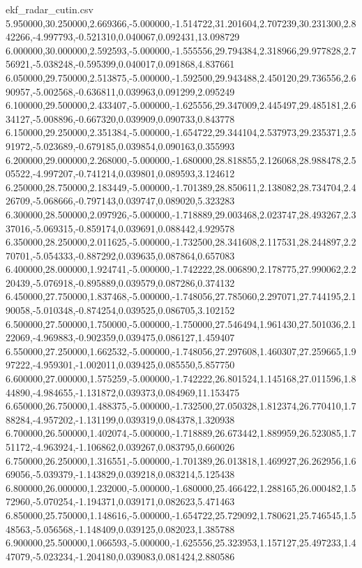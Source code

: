 \begin{filecontents*}[overwrite]{ekf_radar_cutin.csv}
5.950000,30.250000,2.669366,-5.000000,-1.514722,31.201604,2.707239,30.231300,2.842266,-4.997793,-0.521310,0.040067,0.092431,13.098729
6.000000,30.000000,2.592593,-5.000000,-1.555556,29.794384,2.318966,29.977828,2.756921,-5.038248,-0.595399,0.040017,0.091868,4.837661
6.050000,29.750000,2.513875,-5.000000,-1.592500,29.943488,2.450120,29.736556,2.690957,-5.002568,-0.636811,0.039963,0.091299,2.095249
6.100000,29.500000,2.433407,-5.000000,-1.625556,29.347009,2.445497,29.485181,2.634127,-5.008896,-0.667320,0.039909,0.090733,0.843778
6.150000,29.250000,2.351384,-5.000000,-1.654722,29.344104,2.537973,29.235371,2.591972,-5.023689,-0.679185,0.039854,0.090163,0.355993
6.200000,29.000000,2.268000,-5.000000,-1.680000,28.818855,2.126068,28.988478,2.505522,-4.997207,-0.741214,0.039801,0.089593,3.124612
6.250000,28.750000,2.183449,-5.000000,-1.701389,28.850611,2.138082,28.734704,2.426709,-5.068666,-0.797143,0.039747,0.089020,5.323283
6.300000,28.500000,2.097926,-5.000000,-1.718889,29.003468,2.023747,28.493267,2.337016,-5.069315,-0.859174,0.039691,0.088442,4.929578
6.350000,28.250000,2.011625,-5.000000,-1.732500,28.341608,2.117531,28.244897,2.270701,-5.054333,-0.887292,0.039635,0.087864,0.657083
6.400000,28.000000,1.924741,-5.000000,-1.742222,28.006890,2.178775,27.990062,2.220439,-5.076918,-0.895889,0.039579,0.087286,0.374132
6.450000,27.750000,1.837468,-5.000000,-1.748056,27.785060,2.297071,27.744195,2.190058,-5.010348,-0.874254,0.039525,0.086705,3.102152
6.500000,27.500000,1.750000,-5.000000,-1.750000,27.546494,1.961430,27.501036,2.122069,-4.969883,-0.902359,0.039475,0.086127,1.459407
6.550000,27.250000,1.662532,-5.000000,-1.748056,27.297608,1.460307,27.259665,1.997222,-4.959301,-1.002011,0.039425,0.085550,5.857750
6.600000,27.000000,1.575259,-5.000000,-1.742222,26.801524,1.145168,27.011596,1.844890,-4.984655,-1.131872,0.039373,0.084969,11.153475
6.650000,26.750000,1.488375,-5.000000,-1.732500,27.050328,1.812374,26.770410,1.788284,-4.957202,-1.131199,0.039319,0.084378,1.320938
6.700000,26.500000,1.402074,-5.000000,-1.718889,26.673442,1.889959,26.523085,1.751172,-4.963924,-1.106862,0.039267,0.083795,0.660026
6.750000,26.250000,1.316551,-5.000000,-1.701389,26.013818,1.469927,26.262956,1.669056,-5.039379,-1.143829,0.039218,0.083214,5.125438
6.800000,26.000000,1.232000,-5.000000,-1.680000,25.466422,1.288165,26.000482,1.572960,-5.070254,-1.194371,0.039171,0.082623,5.471463
6.850000,25.750000,1.148616,-5.000000,-1.654722,25.729092,1.780621,25.746545,1.548563,-5.056568,-1.148409,0.039125,0.082023,1.385788
6.900000,25.500000,1.066593,-5.000000,-1.625556,25.323953,1.157127,25.497233,1.447079,-5.023234,-1.204180,0.039083,0.081424,2.880586

\end{filecontents*}
